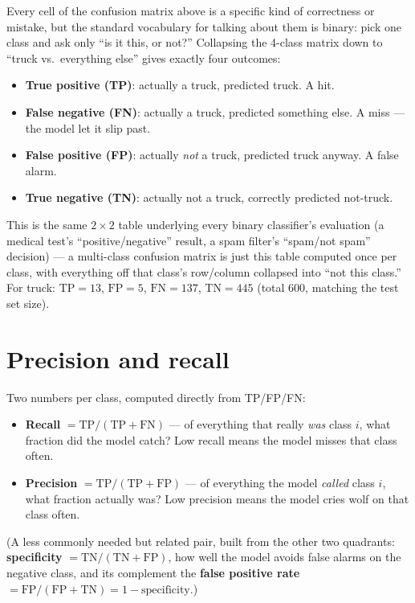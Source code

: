 Every cell of the confusion matrix above is a specific kind of correctness or mistake, but the standard vocabulary for talking about them is binary: pick one class and ask only ``is it this, or not?'' Collapsing the 4-class matrix down to ``truck vs.\ everything else'' gives exactly four outcomes:
\begin{itemize}
  \item \textbf{True positive (TP)}: actually a truck, predicted truck. A hit.
  \item \textbf{False negative (FN)}: actually a truck, predicted something else. A miss --- the model let it slip past.
  \item \textbf{False positive (FP)}: actually \emph{not} a truck, predicted truck anyway. A false alarm.
  \item \textbf{True negative (TN)}: actually not a truck, correctly predicted not-truck.
\end{itemize}
This is the same $2\times2$ table underlying every binary classifier's evaluation (a medical test's ``positive/negative'' result, a spam filter's ``spam/not spam'' decision) --- a multi-class confusion matrix is just this table computed once per class, with everything off that class's row/column collapsed into ``not this class.'' For truck: $\text{TP}=13$, $\text{FP}=5$, $\text{FN}=137$, $\text{TN}=445$ (total $600$, matching the test set size).

\section{Precision and recall}

Two numbers per class, computed directly from TP/FP/FN:
\begin{itemize}
  \item \textbf{Recall} $=\text{TP}/(\text{TP}+\text{FN})$ --- of everything that really \emph{was} class $i$, what fraction did the model catch? Low recall means the model misses that class often.
  \item \textbf{Precision} $=\text{TP}/(\text{TP}+\text{FP})$ --- of everything the model \emph{called} class $i$, what fraction actually was? Low precision means the model cries wolf on that class often.
\end{itemize}
(A less commonly needed but related pair, built from the other two quadrants: \textbf{specificity} $=\text{TN}/(\text{TN}+\text{FP})$, how well the model avoids false alarms on the negative class, and its complement the \textbf{false positive rate} $=\text{FP}/(\text{FP}+\text{TN})=1-\text{specificity}$.)

